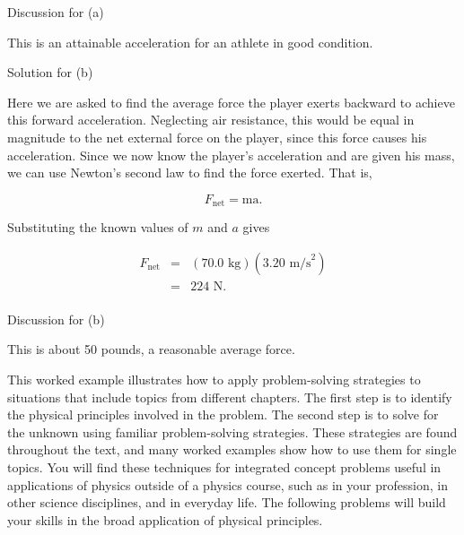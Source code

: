 \documentclass[
]{book}
\newenvironment{tinysection}{}{}
\begin{document}
\begin{tinysection}

{Discussion for (a)}

\end{tinysection}

This is an attainable acceleration for an athlete in good condition.

\begin{tinysection}

{Solution for (b)}

\end{tinysection}

Here we are asked to find the average force the player exerts backward
to achieve this forward acceleration. Neglecting air resistance, this
would be equal in magnitude to the net external force on the player,
since this force causes his acceleration. Since we now know the player's
acceleration and are given his mass, we can use Newton's second law to
find the force exerted. That is,

\leavevmode\hypertarget{eip-id1756199}{}%
\[{F_{\text{net}} = \text{ma}}.\]

Substituting the known values of \(m{}\) and \(a{}\) gives

\leavevmode\hypertarget{eip-id1351504}{}%
\[\begin{array}{lll}
F_{\text{net}} & = & {(\text{70.0\ kg})(3\text{.}\text{20\ m/s}^{2})} \\
 & = & {\text{224\ N}.} \\
\end{array}{}\]

\begin{tinysection}

{Discussion for (b)}

\end{tinysection}

This is about 50 pounds, a reasonable average force.

This worked example illustrates how to apply problem-solving strategies
to situations that include topics from different chapters. The first
step is to identify the physical principles involved in the problem. The
second step is to solve for the unknown using familiar problem-solving
strategies. These strategies are found throughout the text, and many
worked examples show how to use them for single topics. You will find
these techniques for integrated concept problems useful in applications
of physics outside of a physics course, such as in your profession, in
other science disciplines, and in everyday life. The following problems
will build your skills in the broad application of physical principles.
\end{document}
